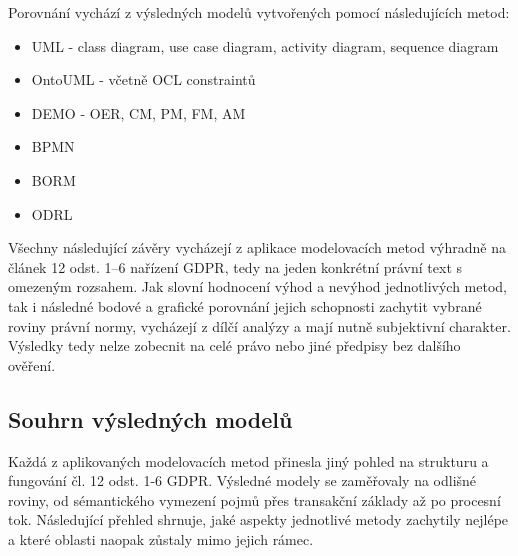 Porovnání vychází z výsledných modelů vytvořených pomocí následujících metod:
\begin{itemize}
  \item UML - class diagram, use case diagram, activity diagram, sequence diagram
  \item OntoUML - včetně OCL constraintů
  \item DEMO - OER, CM, PM, FM, AM
  \item BPMN
  \item BORM
  \item ODRL
\end{itemize}

\noindent Všechny následující závěry vycházejí z aplikace modelovacích metod výhradně na článek 12 odst. 1–6 nařízení GDPR, tedy na jeden konkrétní právní text s omezeným rozsahem. Jak slovní hodnocení výhod a nevýhod jednotlivých metod, tak i následné bodové a grafické porovnání jejich schopnosti zachytit vybrané roviny právní normy, vycházejí z dílčí analýzy a mají nutně subjektivní charakter. Výsledky tedy nelze zobecnit na celé právo nebo jiné předpisy bez dalšího ověření.



\subsection{Souhrn výsledných modelů}
\label{sec:souhrn-vyslednych-modelu}

Každá z aplikovaných modelovacích metod přinesla jiný pohled na strukturu a fungování čl. 12 odst. 1-6 GDPR. Výsledné modely se zaměřovaly na odlišné roviny, od sémantického vymezení pojmů přes transakční základy až po procesní tok. Následující přehled shrnuje, jaké aspekty jednotlivé metody zachytily nejlépe a které oblasti naopak zůstaly mimo jejich rámec.

